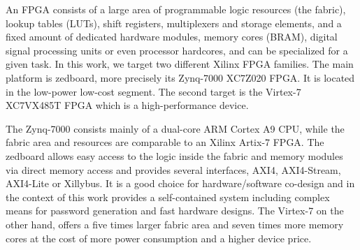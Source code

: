 An FPGA consists of a large area of programmable logic resources (the fabric),
\eg lookup tables (LUTs), shift registers, multiplexers and storage elements,
and a fixed amount of dedicated hardware modules, \eg memory cores (BRAM),
digital signal processing units or even processor hardcores, and can be
specialized for a given task.
%
In this work, we target two different Xilinx FPGA families. The main platform is
zedboard, more precisely its Zynq-7000 XC7Z020 FPGA. It is located in the
low-power low-cost segment. The second target is the Virtex-7 XC7VX485T FPGA
which is a high-performance device.

The Zynq-7000 consists mainly of a dual-core ARM Cortex A9 CPU, while the fabric
area and resources are comparable to an Xilinx Artix-7 FPGA. The zedboard allows
easy access to the logic inside the fabric and memory modules via direct memory
access and provides several interfaces, \eg AXI4, AXI4-Stream, AXI4-Lite or
Xillybus. It is a good choice for hardware/software co-design and in the context
of this work provides a self-contained system including complex means for
password generation and fast hardware designs. The Virtex-7 on the other hand,
offers a five times larger fabric area and seven times more memory cores at the
cost of more power consumption and a higher device price.
